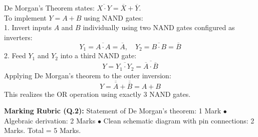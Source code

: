 \begin{solutionbox}[Solution to Q.2]
De Morgan's Theorem states: $\overline{X \cdot Y} = \overline{X} + \overline{Y}$.\\
To implement $Y = A + B$ using NAND gates:\\
1. Invert inputs $A$ and $B$ individually using two NAND gates configured as inverters:
\[ Y_1 = \overline{A \cdot A} = \overline{A}, \quad Y_2 = \overline{B \cdot B} = \overline{B} \]
2. Feed $Y_1$ and $Y_2$ into a third NAND gate:
\[ Y = \overline{Y_1 \cdot Y_2} = \overline{\overline{A} \cdot \overline{B}} \]
Applying De Morgan's theorem to the outer inversion:
\[ Y = \overline{\overline{A}} + \overline{\overline{B}} = A + B \]
This realizes the OR operation using exactly 3 NAND gates.
\end{solutionbox}
\begin{markingrubric}
\textbf{Marking Rubric (Q.2):} Statement of De Morgan's theorem: 1 Mark $\bullet$ Algebraic derivation: 2 Marks $\bullet$ Clean schematic diagram with pin connections: 2 Marks. Total = 5 Marks.
\end{markingrubric}
\newpage
